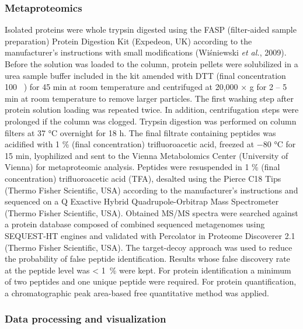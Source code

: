 \documentclass[
  12pt,
]{article}
\begin{document}
\hypertarget{metaproteomics}{%
\subsubsection{Metaproteomics}\label{metaproteomics}}

Isolated proteins were whole trypsin digested using the FASP
(filter-aided sample preparation) Protein Digestion Kit (Expedeon, UK)
according to the manufacturer's instructions with small modifications
(Wiśniewski \emph{et al.}, 2009). Before the solution was loaded to the
column, protein pellets were solubilized in a urea sample buffer
included in the kit amended with DTT (final concentration 100
\si{\milli\Molar}) for 45 \si{\minute} at room temperature and
centrifuged at 20,000 × g for 2 -- 5 \si{\minute} at room temperature to
remove larger particles. The first washing step after protein solution
loading was repeated twice. In addition, centrifugation steps were
prolonged if the column was clogged. Trypsin digestion was performed on
column filters at 37 \si{\degreeCelsius} overnight for 18 \si{\hour}.
The final filtrate containing peptides was acidified with 1
\si{\percent} (final concentration) trifluoroacetic acid, freezed at
\num{-80} \si{\degreeCelsius} for 15 \si{\minute}, lyophilized and sent
to the Vienna Metabolomics Center (University of Vienna) for
metaproteomic analysis. Peptides were resuspended in 1 \si{\percent}
(final concentration) trifluoroacetic acid (TFA), desalted using the
Pierce C18 Tips (Thermo Fisher Scientific, USA) according to the
manufacturer's instructions and sequenced on a Q Exactive Hybrid
Quadrupole-Orbitrap Mass Spectrometer (Thermo Fisher Scientific, USA).
Obtained MS/MS spectra were searched against a protein database composed
of combined sequenced metagenomes using SEQUEST-HT engines and validated
with Percolator in Proteome Discoverer 2.1 (Thermo Fisher Scientific,
USA). The target-decoy approach was used to reduce the probability of
false peptide identification. Results whose false discovery rate at the
peptide level was \SI{< 1}{\percent} were kept. For protein
identification a minimum of two peptides and one unique peptide were
required. For protein quantification, a chromatographic peak area-based
free quantitative method was applied.

\hypertarget{data-processing-and-visualization}{%
\subsubsection{Data processing and
visualization}\label{data-processing-and-visualization}}
\end{document}
